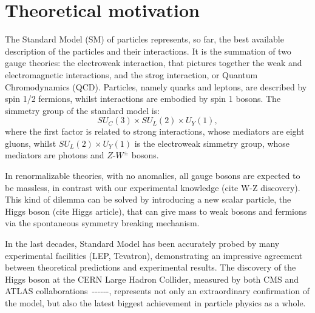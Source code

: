 \chapter{Theoretical motivation}
\label{sec:theory}

The Standard Model (SM) of particles represents, so far, the best available description of the particles and their interactions. It is the summation of two gauge theories: the electroweak interaction, that pictures together the weak and electromagnetic interactions, and the strog interaction, or Quantum Chromodynamics (QCD). Particles, namely quarks and leptons, are described by spin 1/2 fermions, whilst interactions are embodied by spin 1 bosons. The simmetry group of the standard model is:
\begin{equation}
SU_{C}(3) \times SU_L (2) \times U_Y (1),
\end{equation}
\label{eq:theory_SMgroup}
where the first factor is related to strong interactions, whose mediators are eight gluons, whilst $SU_L (2) \times U_Y (1)$ is the electroweak simmetry group, whose mediators are photons and $Z$-$W^{\pm}$ bosons.

In renormalizable theories, with no anomalies, all gauge bosons are expected to be massless, in contrast with our experimental knowledge (cite W-Z discovery). This kind of dilemma can be solved by introducing a new scalar particle, the Higgs boson (cite Higgs article), that can give mass to weak bosons and fermions via the spontaneous symmetry breaking mechanism.

In the last decades, Standard Model has been accurately probed by many experimental facilities (LEP, Tevatron), demonstrating an impressive agreement between theoretical predictions and experimental results. The discovery of the Higgs boson at the CERN Large Hadron Collider, measured by both CMS and ATLAS collaborations~\cite{bib:Aad20121}-\cite{bib:Chatrchyan201230}-\cite{bib:Chatrchyan2013lba}-\cite{Aad:2013xqa}-\cite{Khachatryan:2014jba}-\cite{Aad:2014aba}-\cite{Aad:2015zhl}, represents not only an extraordinary confirmation of the model, but also the latest biggest achievement in particle physics as a whole.

